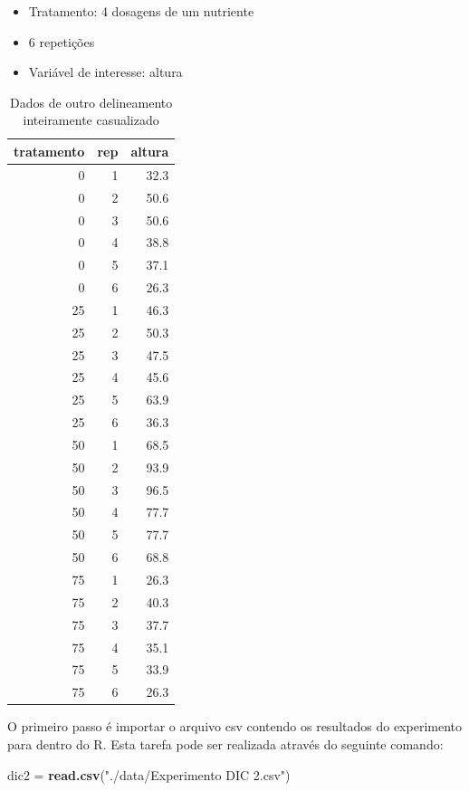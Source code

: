 \documentclass[
]{article}
\newenvironment{Shaded}{\begin{snugshade}}{\end{snugshade}}
\newcommand{\KeywordTok}[1]{\textcolor[rgb]{0.13,0.29,0.53}{\textbf{#1}}}
\newcommand{\NormalTok}[1]{#1}
\newcommand{\StringTok}[1]{\textcolor[rgb]{0.31,0.60,0.02}{#1}}
\providecommand{\tightlist}{%
  \setlength{\itemsep}{0pt}\setlength{\parskip}{0pt}}
\begin{document}
\begin{itemize}
\tightlist
\item
  Tratamento: 4 dosagens de um nutriente
\item
  6 repetições
\item
  Variável de interesse: altura
\end{itemize}

\begin{table}

\caption{\label{tab:unnamed-chunk-54}Dados de outro delineamento inteiramente casualizado}
\centering
\begin{tabular}[t]{r|r|r}
\hline
tratamento & rep & altura\\
\hline
0 & 1 & 32.3\\
\hline
0 & 2 & 50.6\\
\hline
0 & 3 & 50.6\\
\hline
0 & 4 & 38.8\\
\hline
0 & 5 & 37.1\\
\hline
0 & 6 & 26.3\\
\hline
25 & 1 & 46.3\\
\hline
25 & 2 & 50.3\\
\hline
25 & 3 & 47.5\\
\hline
25 & 4 & 45.6\\
\hline
25 & 5 & 63.9\\
\hline
25 & 6 & 36.3\\
\hline
50 & 1 & 68.5\\
\hline
50 & 2 & 93.9\\
\hline
50 & 3 & 96.5\\
\hline
50 & 4 & 77.7\\
\hline
50 & 5 & 77.7\\
\hline
50 & 6 & 68.8\\
\hline
75 & 1 & 26.3\\
\hline
75 & 2 & 40.3\\
\hline
75 & 3 & 37.7\\
\hline
75 & 4 & 35.1\\
\hline
75 & 5 & 33.9\\
\hline
75 & 6 & 26.3\\
\hline
\end{tabular}
\end{table}

O primeiro passo é importar o arquivo csv contendo os resultados do experimento para dentro do R. Esta tarefa pode ser realizada através do seguinte comando:

\begin{Shaded}
\begin{Highlighting}[]
\NormalTok{dic2 =}\StringTok{ }\KeywordTok{read.csv}\NormalTok{(}\StringTok{"./data/Experimento DIC 2.csv"}\NormalTok{)}
\end{Highlighting}
\end{Shaded}
\end{document}

